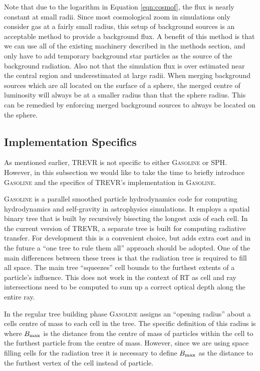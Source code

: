 \documentclass[fleq,usenatbib]{mnras}
\newcommand{\acro}{TREVR}
\begin{document}
Note that due to the logarithm in Equation \ref{eqn:cosmof}, the flux is 
nearly constant at small radii. Since most cosmological zoom in simulations 
only consider gas at a fairly small radius, this setup of background sources 
is an acceptable method to provide a background flux. A benefit of this method 
is that we can use all of the existing machinery described in the methods 
section, and only have to add temporary background star particles as the 
source of the background radiation. Also not that the simulation flux is over 
estimated near the central region and underestimated at large radii. When 
merging background sources which are all located on the surface of a sphere, 
the merged centre of luminosity will always be at a smaller radius than that 
the sphere radius. This can be remedied by enforcing merged background sources 
to always be located on the sphere. 

\subsection{Implementation Specifics}\label{sec:specs}
As mentioned earlier, \acro{} is not specific to either \textsc{Gasoline} or 
SPH. However, in this subsection we would like to take the time to briefly  
introduce \textsc{Gasoline} and the specifics of \acro{}'s implementation in 
\textsc{Gasoline}.

\textsc{Gasoline} is a parallel smoothed particle hydrodynamics code for 
computing hydrodynamics and self-gravity in astrophysics simulations. It 
employs a spatial binary tree that is built by recursively bisecting the 
longest axis of each cell. In the current version of \acro{}, a separate tree 
is built for computing radiative transfer. For development this is a 
convenient choice, but adds extra cost and in the future a ``one tree to rule 
them all'' approach should be adopted. One of the main differences between 
these trees is that the radiation tree is required to fill all space. The main 
tree ``squeezes'' cell bounds to the furthest extents of a particle's 
influence. This does not work in the context of RT as cell and ray 
intersections need to be computed to sum up a correct optical depth along 
the entire ray.

In the regular tree building phase \textsc{Gasoline} assigns an ``opening 
radius'' about a cells centre of mass to each cell in the tree. The specific 
definition of this radius is 
where $B_{\rm max}$ is the  distance from the centre of mass of particles 
within the cell to the furthest particle from the centre of mass. However, 
since we are using space filling cells for the radiation tree it is necessary 
to define $B_{\rm max}$ as the distance to the furthest vertex of the cell 
instead of particle.
\end{document}
